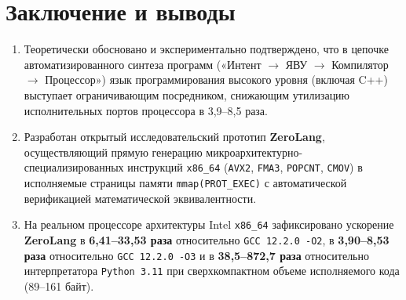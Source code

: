 \documentclass[11pt,a4paper]{article}
\begin{document}
\section{Заключение и выводы}

\begin{enumerate}
\setlength{\itemsep}{2pt}\setlength{\parskip}{0pt}
    \item Теоретически обосновано и экспериментально подтверждено, что в цепочке автоматизированного синтеза программ («Интент $\to$ ЯВУ $\to$ Компилятор $\to$ Процессор») язык программирования высокого уровня (включая C++) выступает ограничивающим посредником, снижающим утилизацию исполнительных портов процессора в 3,9–8,5 раза.
    \item Разработан открытый исследовательский прототип \textbf{ZeroLang}, осуществляющий прямую генерацию микроархитектурно-специализированных инструкций \texttt{x86\_64} (\texttt{AVX2}, \texttt{FMA3}, \texttt{POPCNT}, \texttt{CMOV}) в исполняемые страницы памяти \texttt{mmap(PROT\_EXEC)} с автоматической верификацией математической эквивалентности.
    \item На реальном процессоре архитектуры Intel \texttt{x86\_64} зафиксировано ускорение \textbf{ZeroLang} в \textbf{6,41–33,53 раза} относительно \texttt{GCC 12.2.0 -O2}, в \textbf{3,90–8,53 раза} относительно \texttt{GCC 12.2.0 -O3} и в \textbf{38,5–872,7 раза} относительно интерпретатора \texttt{Python 3.11} при сверхкомпактном объеме исполняемого кода (89–161 байт).
\end{enumerate}
\end{document}
